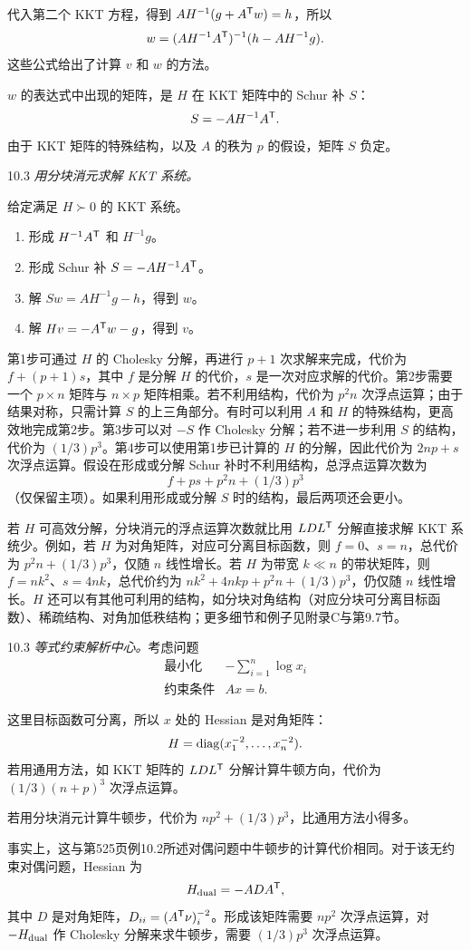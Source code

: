 代入第二个 KKT 方程，得到 $AH^{-1}(g+A^\mathsf T w)=h$，所以
\[w=(AH^{-1}A^\mathsf T)^{-1}(h-AH^{-1}g).\]
这些公式给出了计算 $v$ 和 $w$ 的方法。

$w$ 的表达式中出现的矩阵，是 $H$ 在 KKT 矩阵中的 Schur 补 $S$：
\[S=-AH^{-1}A^\mathsf T.\]
由于 KKT 矩阵的特殊结构，以及 $A$ 的秩为 $p$ 的假设，矩阵 $S$ 负定。

\begin{origalgorithm}{10.3}
\emph{用分块消元求解 KKT 系统。}

给定满足 $H\succ0$ 的 KKT 系统。
\begin{enumerate}
\item 形成 $H^{-1}A^\mathsf T$ 和 $H^{-1}g$。
\item 形成 Schur 补 $S=-AH^{-1}A^\mathsf T$。
\item 解 $Sw=AH^{-1}g-h$，得到 $w$。
\item 解 $Hv=-A^\mathsf T w-g$，得到 $v$。
\end{enumerate}
\end{origalgorithm}
第1步可通过 $H$ 的 Cholesky 分解，再进行 $p+1$ 次求解来完成，代价为 $f+(p+1)s$，其中 $f$ 是分解 $H$ 的代价，$s$ 是一次对应求解的代价。第2步需要一个 $p\times n$ 矩阵与 $n\times p$ 矩阵相乘。若不利用结构，代价为 $p^2n$ 次浮点运算；由于结果对称，只需计算 $S$ 的上三角部分。有时可以利用 $A$ 和 $H$ 的特殊结构，更高效地完成第2步。第3步可以对 $-S$ 作 Cholesky 分解；若不进一步利用 $S$ 的结构，代价为 $(1/3)p^3$。第4步可以使用第1步已计算的 $H$ 的分解，因此代价为 $2np+s$ 次浮点运算。假设在形成或分解 Schur 补时不利用结构，总浮点运算次数为
\[f+ps+p^2n+(1/3)p^3\]
（仅保留主项）。如果利用形成或分解 $S$ 时的结构，最后两项还会更小。

若 $H$ 可高效分解，分块消元的浮点运算次数就比用 $LDL^\mathsf T$ 分解直接求解 KKT 系统少。例如，若 $H$ 为对角矩阵，对应可分离目标函数，则 $f=0$、$s=n$，总代价为 $p^2n+(1/3)p^3$，仅随 $n$ 线性增长。若 $H$ 为带宽 $k\ll n$ 的带状矩阵，则 $f=nk^2$、$s=4nk$，总代价约为 $nk^2+4nkp+p^2n+(1/3)p^3$，仍仅随 $n$ 线性增长。$H$ 还可以有其他可利用的结构，如分块对角结构（对应分块可分离目标函数）、稀疏结构、对角加低秩结构；更多细节和例子见附录C与第9.7节。

\begin{origexample}{10.3}
\emph{等式约束解析中心。}考虑问题
\[\begin{array}{ll}\text{最小化}&-\displaystyle\sum_{i=1}^n\log x_i\\\text{约束条件}&Ax=b.\end{array}\]

这里目标函数可分离，所以 $x$ 处的 Hessian 是对角矩阵：
\[H=\operatorname{diag}(x_1^{-2},\ldots,x_n^{-2}).\]
若用通用方法，如 KKT 矩阵的 $LDL^\mathsf T$ 分解计算牛顿方向，代价为 $(1/3)(n+p)^3$ 次浮点运算。

若用分块消元计算牛顿步，代价为 $np^2+(1/3)p^3$，比通用方法小得多。

事实上，这与第525页例10.2所述对偶问题中牛顿步的计算代价相同。对于该无约束对偶问题，Hessian 为
\[H_{\rm dual}=-ADA^\mathsf T,\]
其中 $D$ 是对角矩阵，$D_{ii}=(A^\mathsf T\nu)_i^{-2}$。形成该矩阵需要 $np^2$ 次浮点运算，对 $-H_{\rm dual}$ 作 Cholesky 分解来求牛顿步，需要 $(1/3)p^3$ 次浮点运算。
\end{origexample}

